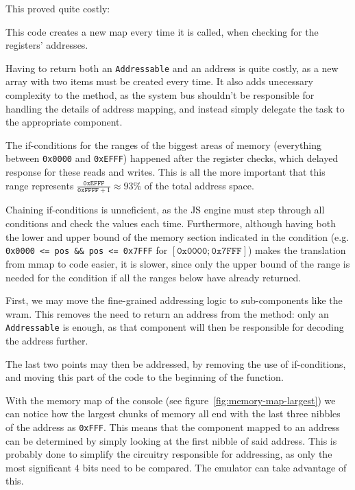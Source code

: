 \documentclass[11pt]{report}
\begin{document}
This proved quite costly:
\begin{compactitem}
    \item This code creates a new map every time it is called, when checking for the registers' addresses.
    \item Having to return both an \texttt{Addressable} and an address is quite costly, as a new array with two items must be created every time. It also adds unecessary complexity to the method, as the system bus shouldn't be responsible for handling the details of address mapping, and instead simply delegate the task to the appropriate component.
    \item The if-conditions for the ranges of the biggest areas of memory (everything between \texttt{0x0000} and \texttt{0xEFFF}) happened after the register checks, which delayed response for these reads and writes. This is all the more important that this range represents $\frac{\texttt{0xEFFF}}{\texttt{0xFFFF}+1} \approx 93\%$ of the total address space.
    \item Chaining if-conditions is unneficient, as the JS engine must step through all conditions and check the values each time. Furthermore, although having both the lower and upper bound of the memory section indicated in the condition (e.g. \texttt{0x0000 <= pos \&\& pos <= 0x7FFF} for $[\texttt{0x0000}; \texttt{0x7FFF}]$) makes the translation from \gls{mmap} to code easier, it is slower, since only the upper bound of the range is needed for the condition if all the ranges below have already returned.
\end{compactitem}

First, we may move the fine-grained addressing logic to sub-components like the \gls{wram}. This removes the need to return an address from the method: only an \texttt{Addressable} is enough, as that component will then be responsible for decoding the address further.

The last two points may then be addressed, by removing the use of if-conditions, and moving this part of the code to the beginning of the function.

With the memory map of the console (see figure~\ref{fig:memory-map-largest}) we can notice how the largest chunks of memory all end with the last three nibbles of the address as \texttt{0xFFF}. This means that the component mapped to an address can be determined by simply looking at the first nibble of said address. This is probably done to simplify the circuitry responsible for addressing, as only the most significant 4 bits need to be compared. The emulator can take advantage of this.
\end{document}

